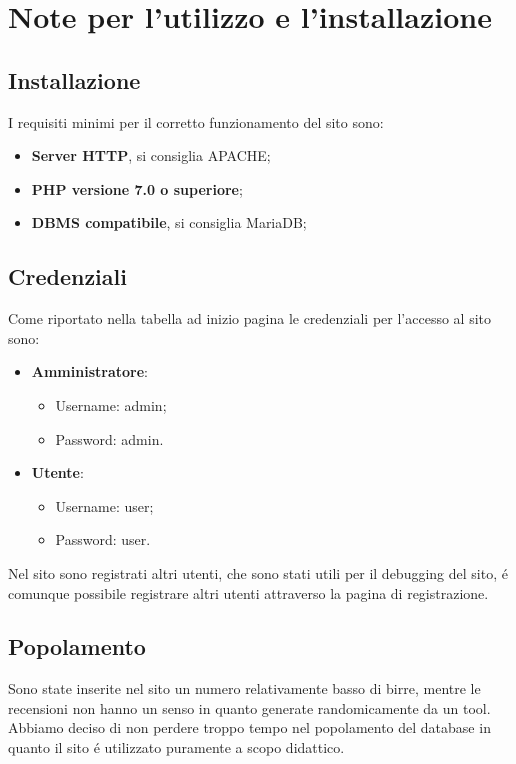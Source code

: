 \section{Note per l'utilizzo e l'installazione}
\subsection{Installazione}
I requisiti minimi per il corretto funzionamento del sito sono:
\begin{itemize}
\item \textbf{Server HTTP}, si consiglia APACHE;
\item \textbf{PHP versione 7.0 o superiore};
\item \textbf{DBMS compatibile}, si consiglia MariaDB;
\end{itemize}
\subsection{Credenziali}
Come riportato nella tabella ad inizio pagina le credenziali per l'accesso al sito sono:
\begin{itemize}
\item \textbf{Amministratore}:
	\begin{itemize}
		\item Username: admin;
		\item Password: admin.
	\end{itemize}

\item \textbf{Utente}:
	\begin{itemize}
		\item Username: user;
		\item Password: user.
	\end{itemize}
\end{itemize}
Nel sito sono registrati altri utenti, che sono stati utili per il debugging del sito, é comunque possibile registrare altri utenti attraverso la pagina di registrazione.
\subsection{Popolamento}
Sono state inserite nel sito un numero relativamente basso di birre, mentre le recensioni non hanno un senso in quanto generate randomicamente da un tool. Abbiamo deciso di non perdere troppo tempo nel popolamento del database in quanto il sito é utilizzato puramente a scopo didattico.
